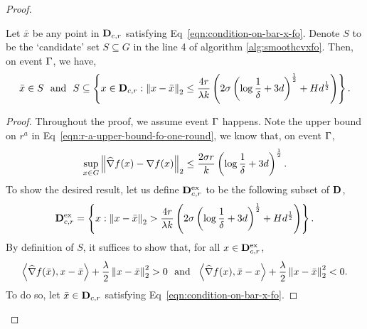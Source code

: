 \begin{proof}
\newcommand{\exc}{^\text{ex}}
\begin{lemma}
\label{lemma:crucial-property}
Let $\bar{x}$ be any point in $\mathbf{D}_{c, r}$ satisfying Eq~\eqref{eqn:condition-on-bar-x-fo}.
Denote $S$ to be the `candidate' set $S \subseteq G$ in the line 4 of algorithm 
\ref{alg:smoothcvxfo}. Then, on event $\Gamma$, we have,
\begin{equation}
\label{eqn:crucial-property}
\bar{x} \in S~~\text{and}~~S \subseteq \left\{x\in \mathbf{D}_{c, r}: 
	\left\|{x - \bar{x}}\right\|_2 \leq \frac{4r}{\lambda k} 
		\left(2\sigma \left(\log \frac{1}{\delta} + 3d\right)^{\frac{1}{2}} + Hd^{\frac{1}{2}}\right)\right\}. 
\end{equation}
\end{lemma}
\begin{proof}
Throughout the proof, we assume event $\Gamma$ happens. Note the upper bound 
on $r^a$ in Eq~\eqref{eqn:r-a-upper-bound-fo-one-round}, we know that, on event 
$\Gamma$,  
\begin{equation}
\label{eqn:event-happens}
\sup_{x\in G} \left\|{\widehat{\nabla} f(x) - \nabla f(x)}\right\|_2  \leq 
	\frac{2\sigma r}{k} \left(\log \frac{1}{\delta} + 3d\right)^{\frac{1}{2}}.
\end{equation} 
To show the desired result, let us define $\xdomain_{c, r}\exc$ to be the following subset of $\mathbf{D}$, 
\begin{equation*}
\xdomain_{c, r}\exc = \left\{x: \ltwo{x-\bar{x}} > \frac{4r}{\lambda k} 
		\left(2\sigma \left(\log \frac{1}{\delta} + 3d\right)^\half + Hd^\half\right)\right\}.
\end{equation*}
By definition of $S$, it suffices to show that, for all $x \in \xdomain_{c, r}\exc$, 
\begin{equation}
\label{eqn:goal-crucial-property}
\left<\widehat{\nabla} f(\bar{x}), x- \bar{x}\right>  + \frac{\lambda}{2}\left\|{x-\bar{x}}\right\|_2^2 > 0 
~~\text{and}~~
\left<\widehat{\nabla} f(x), \bar{x}- x\right>  + \frac{\lambda}{2}\left\|{x-\bar{x}}\right\|_2^2 < 0.
\end{equation}
To do so, let $\bar{x} \in \mathbf{D}_{c, r}$ satisfying Eq~\eqref{eqn:condition-on-bar-x-fo}.

\end{proof}
\end{proof}
